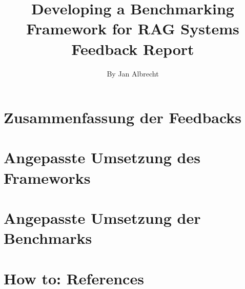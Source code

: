 \documentclass[letterpaper, 10 pt, conference]{ieeeconf}
\title{\LARGE \bf
Developing a Benchmarking Framework for RAG Systems \newline Feedback Report
}
\author{By Jan Albrecht}
\begin{document}
\maketitle
\thispagestyle{plain}
\pagestyle{plain}



\section{Zusammenfassung der Feedbacks}


\section{Angepasste Umsetzung des Frameworks}

\section{Angepasste Umsetzung der Benchmarks}

\section{How to: References}


\end{document}
